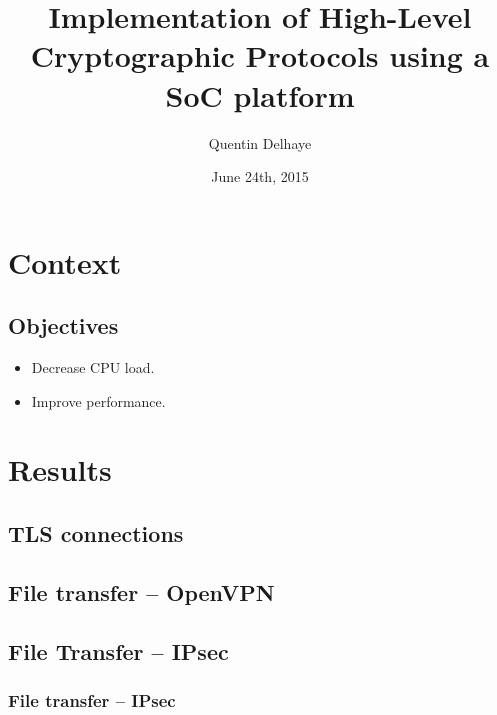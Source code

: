\documentclass[xcolor={x11names, rgb, usenames, dvipsnames}]{beamer}
\author{Quentin Delhaye}
\title[Crypto using a Soc Platform]{Implementation of High-Level\\ Cryptographic Protocols using a SoC platform}
\institute[ULB]{Université Libre de Bruxelles}
\date{June 24th, 2015}
\newcommand\Wider[2][3em]{%
\makebox[\linewidth][c]{%
  \begin{minipage}{\dimexpr\textwidth+#1\relax}
  \raggedright#2
  \end{minipage}%
  }%
}
\begin{document}
\begin{frame}
\titlepage
\end{frame}

\begin{frame}
	\tableofcontents
\end{frame}


\section{Context}

\subsection{Objectives}
\begin{frame}
\begin{itemize}
	\item Decrease CPU load.
	\item Improve performance.
\end{itemize}
\end{frame}



\section{Results}

\subsection{TLS connections}

\subsection{File transfer -- OpenVPN}

\subsection{File Transfer -- IPsec}



\begin{frame}
\frametitle{File transfer -- IPsec}
\Wider[1em]{%
	\begin{minipage}[c]{.48\linewidth}
		\begin{tikzpicture}
		
		\end{tikzpicture}
	\end{minipage} \hfill
	\begin{minipage}[c]{.44\linewidth}
		\begin{tikzpicture}
		
		\end{tikzpicture}
	\end{minipage}
}
\end{frame}



% 
% 
		
\end{document}
